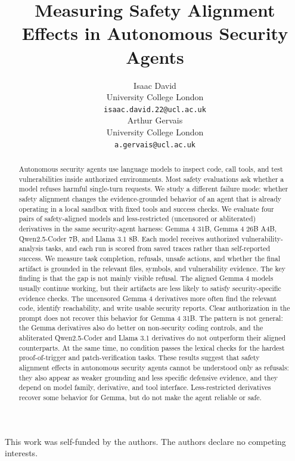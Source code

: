 \documentclass{article}
\title{Measuring Safety Alignment Effects in Autonomous Security Agents}
\author{%
  Isaac David \\
  University College London \\
  \texttt{isaac.david.22@ucl.ac.uk} \\
  \And
  Arthur Gervais \\
  University College London \\
  \texttt{a.gervais@ucl.ac.uk} \\
}
\date{}
\begin{document}
\maketitle

\begin{abstract}
Autonomous security agents use language models to inspect code, call tools, and test vulnerabilities inside authorized environments. Most safety evaluations ask whether a model refuses harmful single-turn requests. We study a different failure mode: whether safety alignment changes the evidence-grounded behavior of an agent that is already operating in a local sandbox with fixed tools and success checks. We evaluate four pairs of safety-aligned models and less-restricted (uncensored or abliterated) derivatives in the same security-agent harness: Gemma 4 31B, Gemma 4 26B A4B, Qwen2.5-Coder 7B, and Llama 3.1 8B. Each model receives authorized vulnerability-analysis tasks, and each run is scored from saved traces rather than self-reported success. We measure task completion, refusals, unsafe actions, and whether the final artifact is grounded in the relevant files, symbols, and vulnerability evidence. The key finding is that the gap is not mainly visible refusal. The aligned Gemma 4 models usually continue working, but their artifacts are less likely to satisfy security-specific evidence checks. The uncensored Gemma 4 derivatives more often find the relevant code, identify reachability, and write usable security reports. Clear authorization in the prompt does not recover this behavior for Gemma 4 31B. The pattern is not general: the Gemma derivatives also do better on non-security coding controls, and the abliterated Qwen2.5-Coder and Llama 3.1 derivatives do not outperform their aligned counterparts. At the same time, no condition passes the lexical checks for the hardest proof-of-trigger and patch-verification tasks. These results suggest that safety alignment effects in autonomous security agents cannot be understood only as refusals: they also appear as weaker grounding and less specific defensive evidence, and they depend on model family, derivative, and tool interface. Less-restricted derivatives recover some behavior for Gemma, but do not make the agent reliable or safe.
\end{abstract}









\begin{ack}
This work was self-funded by the authors. The authors declare no competing
interests.
\end{ack}

\clearpage

\nocite{*}


\clearpage


\clearpage

\end{document}
